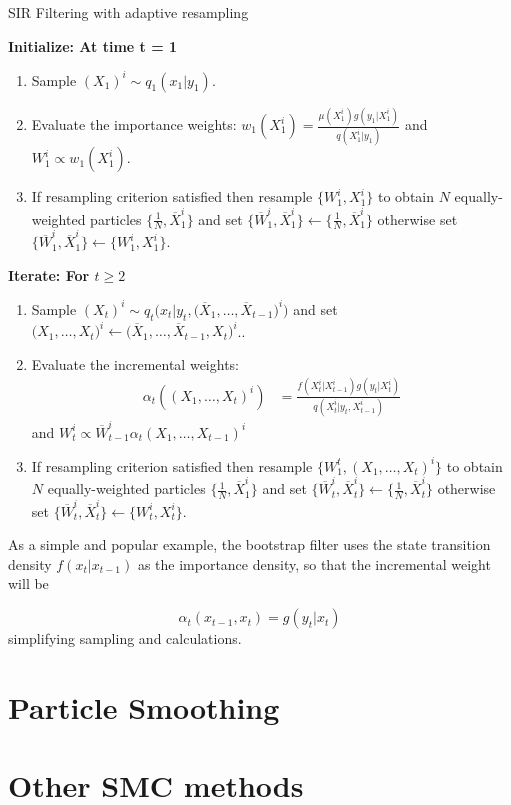 \documentclass[11pt,a4paper]{article}
\begin{document}
\begin{algorithm}[H]
\caption{SIR Filtering with adaptive resampling}\label{Filtering}
    \begin{algorithmic}
        \State  \bf{Initialize:} \normalfont At time t = 1
            \begin{enumerate}
	            \item Sample $(X_{1})^i \sim q_1(x_1 | y_1)$.
	            \item Evaluate the importance weights: $w_1(X_1^i) = \frac{\mu(X^i_1)g(y_1 | X^i_1)}{q(X_1^i | y_1)}$ and $W^i_1 \propto w_1(X_1^i)$.
	            \item If resampling criterion satisfied then resample $\{ W_1^i, X_1^i \}$ to obtain $N$ equally-weighted particles $\big\{ \frac{1}{N}, \overline{X}_1^i \big\}$ and set $\big\{ \overline{W}_1^i, \overline{X}_1^i \big\} \leftarrow \big\{ \frac{1}{N}, \overline{X}_1^i \big\}$ otherwise set $\big\{ \overline{W}_1^i, \overline{X}_1^i \big\} \leftarrow \big\{ W^i_1, X_1^i \big\}$.
            \end{enumerate}
        \State  \bf{Iterate:} \normalfont For $t \geq 2$
            \begin{enumerate}
	            \item Sample $(X_{t})^i \sim q_t \big(x_t | y_t,  \big(\overline{X}_1, \dots, \overline{X}_{t-1} \big)^i \big)$ and set $\big(X_{1}, \dots, X_{t} \big)^i \leftarrow \big(\overline{X}_1, \dots, \overline{X}_{t-1}, X_t \big)^i$..
	            \item Evaluate the incremental weights: 
	                \begin{align*}
	                    \alpha_t((X_1, \dots, X_t)^i) & = \frac{f(X^i_t | X^i_{t-1})g(y_t | X^i_t)}{q(X_t^i | y_t, X^i_{t-1})}
	                \end{align*}
	                and $W^i_t \propto \overline{W}^i_{t-1} \alpha_t(X_1, \dots, X_{t-1})^i$
	            \item If resampling criterion satisfied then resample $\{ W_1^t, (X_1, \dots, X_t)^i \}$ to obtain $N$ equally-weighted particles $\big\{ \frac{1}{N}, \overline{X}_1^i \big\}$ and set $\big\{ \overline{W}_t^i, \overline{X}_t^i \big\} \leftarrow \big\{ \frac{1}{N}, \overline{X}_t^i \big\}$ otherwise set $\big\{ \overline{W}_t^i, \overline{X}_t^i \big\} \leftarrow \big\{ W^i_t, X_t^i \big\}$.
	        \end{enumerate}
    \end{algorithmic}
\end{algorithm}
As a simple and popular example, the bootstrap filter uses the state transition density $f(x_t | x_{t-1})$ as the importance density, so that the incremental weight will be 

\begin{equation*}
    \alpha_t(x_{t-1}, x_t) = g(y_t | x_t)
\end{equation*}
simplifying sampling and calculations.

\section{Particle Smoothing}



\section{Other SMC methods}
\end{document}
